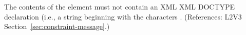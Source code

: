 The contents of the  element must not contain an XML XML
DOCTYPE declaration (i.e., a string beginning with the characters
.  (References: L2V3 Section~\ref{sec:constraint-message}.)
